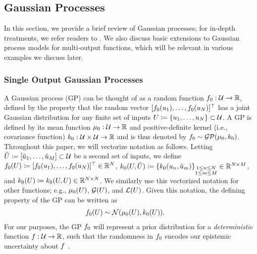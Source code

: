\documentclass[12pt]{article}
\begin{document}
 \subsection{Gaussian Processes} \label{gp_review}
 In this section, we provide a brief review of Gaussian processes; for in-depth treatments, we refer 
 readers to \cite{gramacy2020surrogates, StuartTeck2, gpML}. We also discuss basic extensions
 to Gaussian process models for multi-output functions, which will be relevant in various examples
we discuss later.
 
 \subsubsection{Single Output Gaussian Processes}
 A Gaussian process (GP) can be thought of as a
random function $f_{0}: \mathcal{U} \to \mathbb{R}$, defined by the property that 
the random vector $[f_{0}(u_1), \dots, f_{0}(u_N)]^\top$ has
a joint Gaussian distribution for any finite set of inputs $U \coloneqq \{u_1, \dots, u_N\} \subset \mathcal{U}$. 
A GP is defined by its mean function $\mu_0: \mathcal{U} \to \mathbb{R}$ and positive-definite kernel
(i.e., covariance function) $k_0: \mathcal{U} \times \mathcal{U} \to \mathbb{R}$ and is thus denoted by 
$f_{0} \sim \mathcal{GP}(\mu_0, k_0)$. Throughout this paper, we will vectorize notation as follows. Letting 
$\tilde{U} \coloneqq [\tilde{u}_1, \dots, \tilde{u}_M]  \subset \mathcal{U}$ be a second set of inputs, we define 
$f_{0}(U) \coloneqq [f_{0}(u_1), \dots, f_{0}(u_N)]^\top \in \mathbb{R}^{N}$, 
$k_0(U, \tilde{U}) \coloneqq \{k_0(u_{n}, \tilde{u}_m)\}_{\substack{1 \leq n \leq N \\ 1 \leq m \leq M}} \in \mathbb{R}^{N \times M}$, 
and $k_0(U) \coloneqq k_0(U, U) \in \mathbb{R}^{N \times N}$. 
We similarly use this vectorized notation for other functions; e.g., $\mu_0(U)$, $\mathcal{G}(U)$, and $\mathcal{L}(U)$.
Given this notation, 
the defining property of the GP can be written as 
\begin{align}
f_{0}(U) &\sim \mathcal{N}(\mu_0(U), k_0(U)).
\end{align}
For our purposes, the GP $f_{0}$ will represent a prior distribution for a \textit{deterministic} function 
$f: \mathcal{U} \to \mathbb{R}$, such that the randomness in $f_{0}$ encodes our epistemic 
uncertainty about $f$ \citep{epistemicAleatoric}.
\end{document}
